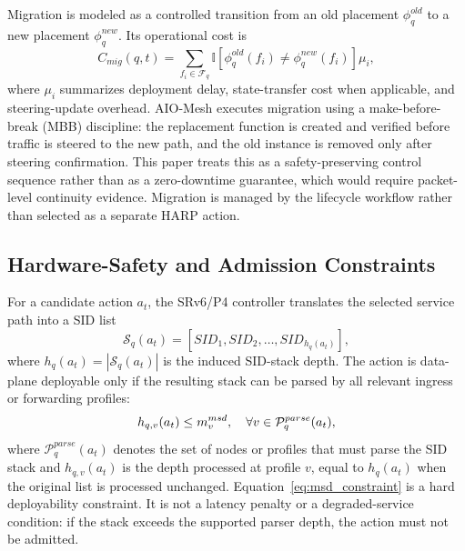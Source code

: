 \documentclass[final,5p]{elsarticle}
\newcommand{\rev}[1]{\textcolor{revisiongreen}{#1}}
\begin{document}
Migration is modeled as a controlled transition from an old placement \(\phi_q^{old}\) to a new placement \(\phi_q^{new}\). Its operational cost is
\begin{equation}
C_{mig}(q,t)=\sum_{f_i\in\mathcal{F}_q}\mathbb{I}\!\left[\phi_q^{old}(f_i)\neq\phi_q^{new}(f_i)\right]\mu_i,
\end{equation}
where \(\mu_i\) summarizes deployment delay, state-transfer cost when applicable, and steering-update overhead. AIO-Mesh executes migration using a \rev{make-before-break (MBB)} discipline: the replacement function is created and verified before traffic is steered to the new path, and the old instance is removed only after steering confirmation. This paper treats this as a safety-preserving control sequence rather than as a zero-downtime guarantee, which would require packet-level continuity evidence. \rev{Migration is managed by the lifecycle workflow rather than selected as a separate HARP action.}

\subsection{Hardware-Safety and Admission Constraints}
\label{subsec:hardware_constraint_model}

For a candidate action \(a_t\), the SRv6/P4 controller translates the selected service path into a SID list
\begin{equation}
\mathcal{S}_q(a_t)=[SID_1,SID_2,\ldots,SID_{h_q(a_t)}],
\end{equation}
where \(h_q(a_t)=|\mathcal{S}_q(a_t)|\) is the induced SID-stack depth. The action is data-plane deployable only if the resulting stack can be parsed by all relevant ingress or forwarding profiles:
\begin{equation}
\rev{h_{q,v}(a_t)\le m_v^{msd},\quad\forall v\in\mathcal{P}^{parse}_q(a_t),}
\label{eq:msd_constraint}
\end{equation}
where \(\mathcal{P}^{parse}_q(a_t)\) denotes the set of nodes or profiles that must parse the SID stack \rev{and \(h_{q,v}(a_t)\) is the depth processed at profile \(v\), equal to \(h_q(a_t)\) when the original list is processed unchanged}. Equation~\eqref{eq:msd_constraint} is a hard deployability constraint. It is not a latency penalty or a degraded-service condition: if the stack exceeds the supported parser depth, the action must not be admitted.
\end{document}
